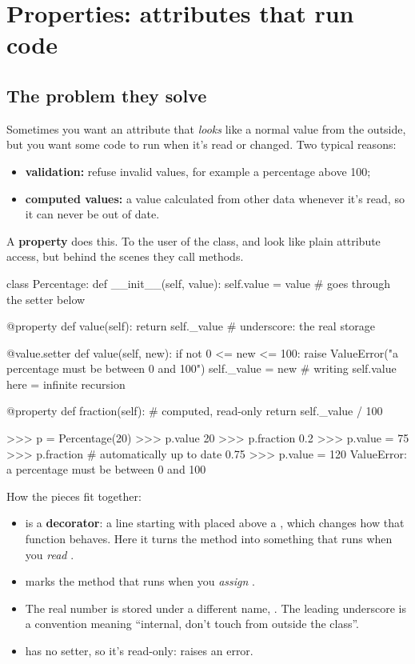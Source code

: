 \documentclass[10pt,a4paper]{article}
\begin{document}
\section{Properties: attributes that run code}
\subsection{The problem they solve}
Sometimes you want an attribute that \emph{looks} like a normal value from the outside, but you want some code to run when it’s read or changed. Two typical reasons:
\begin{itemize}
\item \textbf{validation:} refuse invalid values, for example a percentage above 100;
\item \textbf{computed values:} a value calculated from other data whenever it’s read, so it can never be out of date.
\end{itemize}
A \textbf{property} does this. To the user of the class,  and  look like plain attribute access, but behind the scenes they call methods.
\begin{pycode}
class Percentage:
    def __init__(self, value):
        self.value = value                # goes through the setter below

    @property
    def value(self):
        return self._value                # underscore: the real storage

    @value.setter
    def value(self, new):
        if not 0 <= new <= 100:
            raise ValueError("a percentage must be between 0 and 100")
        self._value = new                 # writing self.value here = infinite recursion

    @property
    def fraction(self):                   # computed, read-only
        return self._value / 100
\end{pycode}
\begin{txtcode}
>>> p = Percentage(20)
>>> p.value
20
>>> p.fraction
0.2
>>> p.value = 75
>>> p.fraction             # automatically up to date
0.75
>>> p.value = 120
ValueError: a percentage must be between 0 and 100
\end{txtcode}
How the pieces fit together:
\begin{itemize}
\item {} is a \textbf{decorator}: a line starting with  placed above a , which changes how that function behaves. Here it turns the method  into something that runs when you \emph{read} .
\item {} marks the method that runs when you \emph{assign} .
\item The real number is stored under a different name, . The leading underscore is a convention meaning “internal, don’t touch from outside the class”.
\item {} has no setter, so it’s read-only:  raises an error.
\end{itemize}
\end{document}
